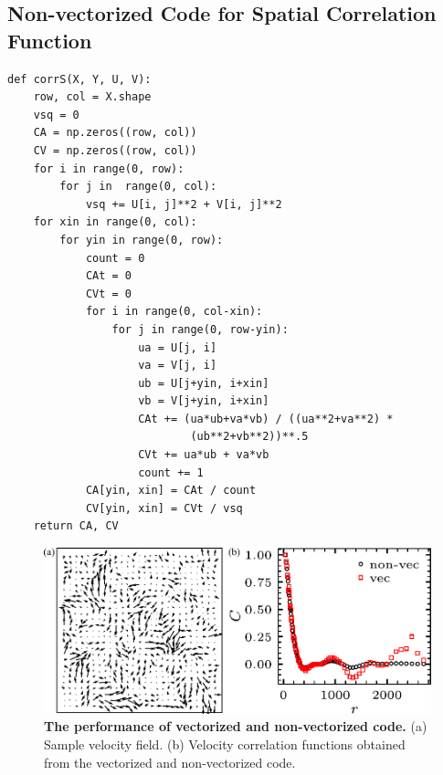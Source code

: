 \subsection{Non-vectorized Code for Spatial Correlation Function}
\begin{verbatim}
def corrS(X, Y, U, V):
    row, col = X.shape
    vsq = 0
    CA = np.zeros((row, col))
    CV = np.zeros((row, col))
    for i in range(0, row):
        for j in  range(0, col):
            vsq += U[i, j]**2 + V[i, j]**2
    for xin in range(0, col):
        for yin in range(0, row):
            count = 0
            CAt = 0
            CVt = 0
            for i in range(0, col-xin):
                for j in range(0, row-yin):
                    ua = U[j, i]
                    va = V[j, i]
                    ub = U[j+yin, i+xin]
                    vb = V[j+yin, i+xin]
                    CAt += (ua*ub+va*vb) / ((ua**2+va**2) *
                            (ub**2+vb**2))**.5
                    CVt += ua*ub + va*vb
                    count += 1
            CA[yin, xin] = CAt / count
            CV[yin, xin] = CVt / vsq
    return CA, CV
\end{verbatim}


\begin{figure}[!ht]
	\begin{center}
	\includegraphics[width=5.5in]{Figs/A-2/vectorization.pdf}
	\end{center}
	\caption[The performance of vectorized and non-vectorized code]
	{
	\textbf{The performance of vectorized and non-vectorized code.}
  (a) Sample velocity field.
  (b) Velocity correlation functions obtained from the vectorized and non-vectorized code.
	}
	\label{fig:vectorization-performance}
\end{figure}


